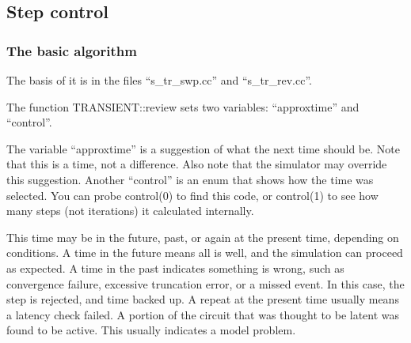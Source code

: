 %
%
%
%
\subsection{Step control}

\subsubsection{The basic algorithm}

The basis of it is in the files ``s\_tr\_swp.cc'' and ``s\_tr\_rev.cc''.

The function TRANSIENT::review sets two variables: ``approxtime'' and
``control''.

The variable ``approxtime'' is a suggestion of what the next time
should be.  Note that this is a time, not a difference.  Also note
that the simulator may override this suggestion.  Another ``control''
is an enum that shows how the time was selected.  You can probe
control(0) to find this code, or control(1) to see how many steps (not
iterations) it calculated internally.

This time may be in the future, past, or again at the present time,
depending on conditions.  A time in the future means all is well, and
the simulation can proceed as expected.  A time in the past indicates
something is wrong, such as convergence failure, excessive truncation
error, or a missed event.  In this case, the step is rejected, and
time backed up.  A repeat at the present time usually means a latency
check failed.  A portion of the circuit that was thought to be latent
was found to be active.  This usually indicates a model problem.

